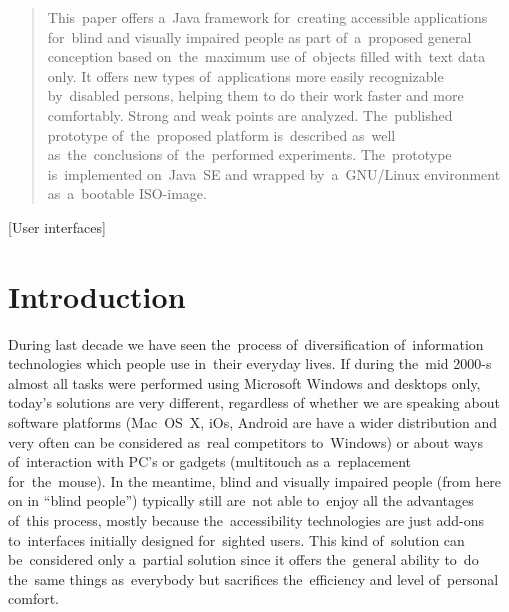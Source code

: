 \documentclass{acm_proc_article-sp}
\begin{document}
\maketitle
\begin{abstract}

This~paper offers a~Java framework for~creating accessible applications for~blind and visually impaired people 
as part of~a~proposed general conception
based on~the~maximum use of~objects filled with~text data only.
It offers new types of~applications more easily recognizable by~disabled persons,
helping them to do their work faster and more comfortably.
Strong and weak points are analyzed.
The~published prototype of~the~proposed platform is~described 
as~well as~the~conclusions of~the~performed experiments.
The~prototype is~implemented on~Java~SE and wrapped by~a~GNU/Linux environment 
as~a~bootable ISO-image.

\end{abstract}

[User interfaces]


\sloppy

\section{Introduction}

During last decade we have seen the~process of~diversification of~information technologies 
which people use in~their everyday lives.
If during the~mid 2000-s almost all tasks were performed using Microsoft Windows and desktops only,
today's solutions  are very different, regardless of whether we are speaking about software platforms 
(Mac~OS~X, iOs, Android are have a wider distribution and very often can be considered as~real competitors to~Windows)
or about ways of~interaction with PC's or gadgets (multitouch as a~replacement for~the~mouse).
In the meantime, blind and visually impaired people (from here on in ``blind people'')
typically still are~not able to~enjoy all the advantages of~this process,
mostly because the~accessibility technologies are just add-ons 
to~interfaces initially designed for~sighted users.
This kind of~solution can be~considered only a~partial solution 
since it offers the~general ability to~do the~same things as~everybody
but sacrifices the~efficiency and level of~personal comfort.
\end{document}
